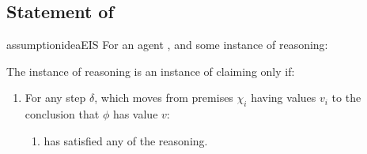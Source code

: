 \section{}
\label{sec:ideaCS}

\subsection{Statement of \ideaCS{}}
\label{sec:ideaCS:statement}

\begin{note}
  \begin{restatable}{assumption}{ideaEIS}
    \label{idea:CS:B}
    \label{assumption:CS}
    For an agent \vAgent{}, and some instance of reasoning:

    The instance of reasoning is an instance of claiming \support{} only if:
    \begin{enumerate}
    \item
      \label{idea:CS:B:step}
      For any step \(\delta\), which moves from premises \(\chi_{i}\) having values \(v_{i}\) to the conclusion that \(\phi\) has value \(v\):
      \begin{enumerate}[label=\alph*., ref=(\alph*)]
      \item
        \vAgent{} has satisfied any \requ{} of the reasoning.

\end{enumerate}
\end{enumerate}
\end{restatable}
\end{note}

